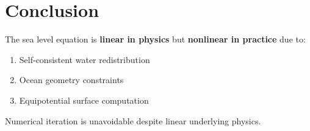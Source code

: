 \documentclass{article}
\begin{document}
\section{Conclusion}

The sea level equation is \textbf{linear in physics} but \textbf{nonlinear in practice} due to:
\begin{enumerate}
\item Self-consistent water redistribution
\item Ocean geometry constraints
\item Equipotential surface computation
\end{enumerate}

Numerical iteration is unavoidable despite linear underlying physics.
\end{document}
